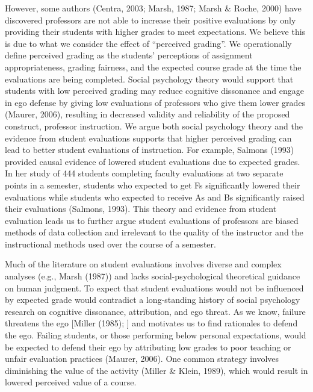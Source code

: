 \documentclass[man]{apa6}
\theoremstyle{definition}
\theoremstyle{definition}
\theoremstyle{definition}
\theoremstyle{remark}
\begin{document}
However, some authors (Centra, 2003; Marsh, 1987; Marsh \& Roche, 2000)
have discovered professors are not able to increase their positive
evaluations by only providing their students with higher grades to meet
expectations. We believe this is due to what we consider the effect of
\enquote{perceived grading}. We operationally define perceived grading
as the students' perceptions of assignment appropriateness, grading
fairness, and the expected course grade at the time the evaluations are
being completed. Social psychology theory would support that students
with low perceived grading may reduce cognitive dissonance and engage in
ego defense by giving low evaluations of professors who give them lower
grades (Maurer, 2006), resulting in decreased validity and reliability
of the proposed construct, professor instruction. We argue both social
psychology theory and the evidence from student evaluations supports
that higher perceived grading can lead to better student evaluations of
instruction. For example, Salmons (1993) provided causal evidence of
lowered student evaluations due to expected grades. In her study of 444
students completing faculty evaluations at two separate points in a
semester, students who expected to get Fs significantly lowered their
evaluations while students who expected to receive As and Bs
significantly raised their evaluations (Salmons, 1993). This theory and
evidence from student evaluation leads us to further argue student
evaluations of professors are biased methods of data collection and
irrelevant to the quality of the instructor and the instructional
methods used over the course of a semester.

Much of the literature on student evaluations involves diverse and
complex analyses (e.g., Marsh (1987)) and lacks social-psychological
theoretical guidance on human judgment. To expect that student
evaluations would not be influenced by expected grade would contradict a
long-standing history of social psychology research on cognitive
dissonance, attribution, and ego threat. As we know, failure threatens
the ego {[}Miller (1985); {]} and motivates us to find rationales to
defend the ego. Failing students, or those performing below personal
expectations, would be expected to defend their ego by attributing low
grades to poor teaching or unfair evaluation practices (Maurer, 2006).
One common strategy involves diminishing the value of the activity
(Miller \& Klein, 1989), which would result in lowered perceived value
of a course.
\end{document}

